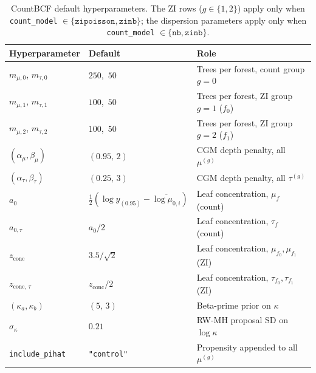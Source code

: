 \documentclass[11pt]{article}
\theoremstyle{plain}
\theoremstyle{definition}
\theoremstyle{remark}
\newcommand{\muF}{\mu_f}
\newcommand{\tauF}{\tau_f}
\newcommand{\azero}{a_{0}}
\newcommand{\azerotau}{a_{0,\tau}}
\newcommand{\fzeroSym}{f_{0}}
\newcommand{\foneSym}{f_{1}}
\newcommand{\muFzero}{\mu_{f_{0}}}
\newcommand{\muFone}{\mu_{f_{1}}}
\newcommand{\tauFzero}{\tau_{f_{0}}}
\newcommand{\tauFone}{\tau_{f_{1}}}
\newcommand{\zconc}{z_{\mathrm{conc}}}
\newcommand{\zconctau}{z_{\mathrm{conc},\,\tau}}
\begin{document}
\begin{table}[t]
\centering
\caption{CountBCF default hyperparameters. The ZI rows ($g \in
\{1, 2\}$) apply only when \texttt{count\_model} $\in
\{\texttt{zipoisson}, \texttt{zinb}\}$; the dispersion parameters
apply only when \texttt{count\_model} $\in \{\texttt{nb},
\texttt{zinb}\}$.}
\label{tab:default-hyperparams}
\begin{tabular}{lll}
\toprule
Hyperparameter & Default & Role \\
\midrule
$m_{\mu, 0}$, $m_{\tau, 0}$ & $250$,\, $50$ & Trees per forest, count group $g = 0$ \\
$m_{\mu, 1}$, $m_{\tau, 1}$ & $100$,\, $50$ & Trees per forest, ZI group $g = 1$ ($\fzeroSym$) \\
$m_{\mu, 2}$, $m_{\tau, 2}$ & $100$,\, $50$ & Trees per forest, ZI group $g = 2$ ($\foneSym$) \\
$(\alpha_\mu, \beta_\mu)$ & $(0.95,\, 2)$ & CGM depth penalty, all $\mu^{(g)}$ \\
$(\alpha_\tau, \beta_\tau)$ & $(0.25,\, 3)$ & CGM depth penalty, all $\tau^{(g)}$ \\
$\azero$ & $\tfrac{1}{2}(\log y_{(0.95)} - \overline{\log \mu_{0,i}})$ & Leaf concentration, $\muF$ (count) \\
$\azerotau$ & $\azero / 2$ & Leaf concentration, $\tauF$ (count) \\
$\zconc$ & $3.5 / \sqrt{2}$ & Leaf concentration, $\muFzero, \muFone$ (ZI) \\
$\zconctau$ & $\zconc / 2$ & Leaf concentration, $\tauFzero, \tauFone$ (ZI) \\
$(\kappa_a, \kappa_b)$ & $(5,\, 3)$ & Beta-prime prior on $\kappa$ \\
$\sigma_\kappa$ & $0.21$ & RW-MH proposal SD on $\log \kappa$ \\
\texttt{include\_pihat} & \texttt{"control"} & Propensity appended to all $\mu^{(g)}$ \\
\bottomrule
\end{tabular}
\end{table}
\end{document}
